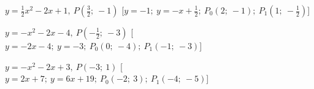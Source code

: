 \begin{esercizio}
\begin{enumeratea}
  \item  \(y=\frac{1}{2} x^2 -2 x +1,~P \left (\frac{3}{2};~-1 \right )\)
   \hfill [\(y = -1;~y = - x +\frac{1}{2};~P_0 \left (2;~-1 \right );~P_1 \left (1;~-\frac{1}{2} \right )\)]
  \item  \(y=- x^2 -2 x -4,~P \left (-\frac{1}{2};~-3 \right )\)
   \hfill [\(y = -2 x -4;~y = -3;~P_0 \left (0;~-4 \right );~P_1 \left (-1;~-3 \right )\)]
  \item  \(y=- x^2 -2 x +3,~P \left (-3;~1 \right )\)
   \hfill [\(y = 2 x +7;~y = 6 x +19;~P_0 \left (-2;~3 \right );~P_1 \left (-4;~-5 \right )\)]
 \end{enumeratea}
\end{esercizio}


